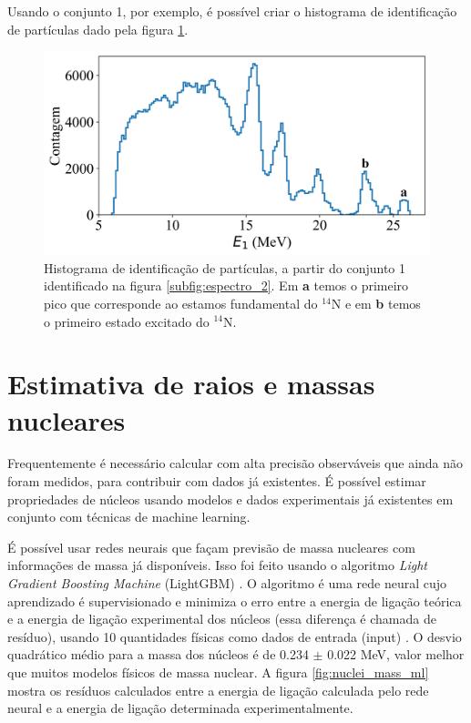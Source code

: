 \documentclass[a4paper,12pt,oneside]{book}
\begin{document}
\begin{appendices}
\par Usando o conjunto 1, por exemplo, é possível criar o histograma de identificação de partículas dado pela figura \ref{fig:PID_hist}.

\begin{figure}[H]
    \centering
    \includegraphics[scale=0.11]{figs/espectro_3.png}
    \caption{Histograma de identificação de partículas, a partir do conjunto 1 identificado na figura \ref{subfig:espectro_2}. Em \textbf{a} temos o primeiro pico que corresponde ao estamos fundamental do $^{14}$N e em \textbf{b} temos o primeiro estado excitado do $^{14}$N.}
    \label{fig:PID_hist}
\end{figure}

\section{Estimativa de raios e massas nucleares}

\par Frequentemente é necessário calcular com alta precisão observáveis que ainda não foram medidos, para contribuir com dados já existentes. É possível estimar propriedades de núcleos usando modelos e dados experimentais já existentes em conjunto com técnicas de machine learning.

\par É possível usar redes neurais que façam previsão de massa nucleares com informações de massa já disponíveis. Isso foi feito usando o algoritmo \textit{Light Gradient Boosting Machine} (LightGBM) \cite{LightGBM}. O algoritmo é uma rede neural cujo aprendizado é supervisionado e minimiza o erro entre a energia de ligação teórica e a energia de ligação experimental dos núcleos (essa diferença é chamada de resíduo), usando 10 quantidades físicas como dados de entrada (input) \cite{nuclear_mass}. O desvio quadrático médio para a massa dos núcleos é de 0.234 $\pm$ 0.022 MeV, valor melhor que muitos modelos físicos de massa nuclear. A figura \ref{fig:nuclei_mass_ml} mostra os resíduos calculados entre a energia de ligação calculada pelo rede neural e a energia de ligação determinada experimentalmente.


\end{appendices}
\end{document}
